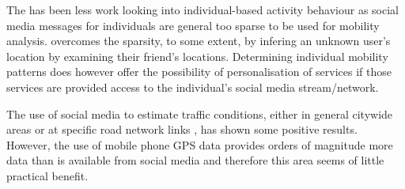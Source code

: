 \documentclass{article}
\begin{document}
The has been less work looking into individual-based activity behaviour as social media messages for individuals are general too sparse to be used for mobility analysis. \cite{compton2014geotagging} overcomes the sparsity, to some extent, by infering an unknown user’s location by examining their friend’s locations. Determining individual mobility patterns does however offer the possibility of personalisation of services if those services are provided access to the individual's social media stream/network.

The use of social media to estimate traffic conditions, either in general citywide areas \citep{wang2015citywide} or at specific road network links \citep{chen2014road}, has shown some positive results. However, the use of mobile phone GPS data provides orders of magnitude more data than is available from social media and therefore this area seems of little practical benefit.
\end{document}

